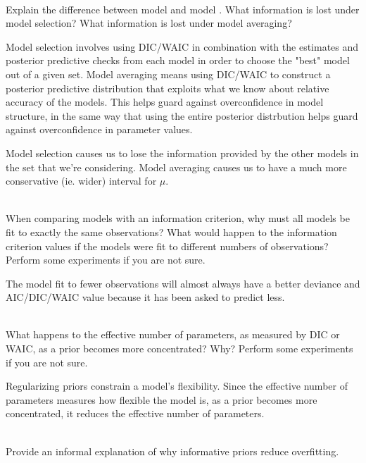 \documentclass[12pt]{article}\usepackage[]{graphicx}\usepackage[]{color}
\newenvironment{problem}[2][Problem]{\begin{trivlist}
\item[\hskip \labelsep {\bfseries #1}\hskip \labelsep {\bfseries #2.}]}{\end{trivlist}}
\begin{document}
\begin{problem}{6M2}
\text{ }\\
Explain the difference between model  and model . What information is lost under model selection? What information is lost under model averaging?
\end{problem}

Model selection involves using DIC/WAIC in combination with the estimates and posterior predictive checks from each model in order to choose the "best" model out of a given set. Model averaging means using DIC/WAIC to construct a posterior predictive distribution that exploits what we know about relative accuracy of the models. This helps guard against overconfidence in model structure, in the same way that using the entire posterior distrbution helps guard against overconfidence in parameter values.

Model selection causes us to lose the information provided by the other models in the set that we're considering. Model averaging causes us to have a much more conservative (ie. wider) interval for $\mu$.

\begin{problem}{6M3}
\text{ }\\
When comparing models with an information criterion, why must all models be fit to exactly the same observations? What would happen to the information criterion values if the models were fit to different numbers of observations? Perform some experiments if you are not sure.
\end{problem}

The model fit to fewer observations will almost always have a better deviance and AIC/DIC/WAIC value because it has been asked to predict less.

\begin{problem}{6M4}
\text{ }\\
What happens to the effective number of parameters, as measured by DIC or WAIC, as a prior becomes more concentrated? Why? Perform some experiments if you are not sure.
\end{problem}

Regularizing priors constrain a model's flexibility. Since the effective number of parameters measures how flexible the model is, as a prior becomes more concentrated, it reduces the effective number of parameters.

\begin{problem}{6M5}
\text{ }\\
Provide an informal explanation of why informative priors reduce overfitting.
\end{problem}
\end{document}
